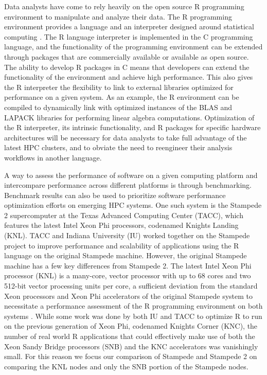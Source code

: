 Data analysts have come to rely heavily on the open source R programming environment to
manipulate and analyze their data. The R programming environment provides a language and
an interpreter designed around statistical computing \cite{ihaka:R}. The R language
interpreter is implemented in the C programming language, and the functionality of the
programming environment can be extended through packages that are commercially available
or available as open source. The ability to develop R packages in C means that developers
can extend the functionality of the environment and achieve high performance. This also
gives the R interpreter the flexibility to link to external libraries optimized for
performance on a given system. As an example, the R environment can be compiled to
dynamically link with optimized instances of the BLAS \cite{dongarra:1990blas} and LAPACK
\cite{hammarling:1988blas} libraries for performing linear algebra computations.
Optimization of the R interpreter, its intrinsic functionality, and R packages for
specific hardware architectures will be necessary for data analysts to take full advantage
of the latest HPC clusters, and to obviate the need to reengineer their analysis workflows
in another language.

A way to assess the performance of software on a given computing platform and intercompare
performance across different platforms is through benchmarking. Benchmark results can also
be used to prioritize software performance optimization efforts on emerging HPC systems.
One such system is the Stampede 2 supercomputer at the Texas Advanced Computing Center
(TACC), which features the latest Intel Xeon Phi processors, codenamed Knights Landing
(KNL). TACC and Indiana University (IU) worked together on the Stampede project to
improve performance and scalability of applications using the R language on the original
Stampede machine. However, the original Stampede machine has a few key differences from
Stampede 2. The latest Intel Xeon Phi processor (KNL) is a many-core, vector processor
with up to 68 cores and two 512-bit vector processing units per core, a sufficient
deviation from the standard Xeon processors and Xeon Phi accelerators of the original
Stampede system to necessitate a performance assessment of the R programming environment
on both systems \cite{tacc:stampedeGuide}. While some work was done by both IU and TACC to
optimize R to run on the previous generation of Xeon Phi, codenamed Knights Corner (KNC),
the number of real world R applications that could effectively make use of both the Xeon
Sandy Bridge processors (SNB) and the KNC accelerators was vanishingly small. For this
reason we focus our comparison of Stampede and Stampede 2 on comparing the KNL nodes and
only the SNB portion of the Stampede nodes.

